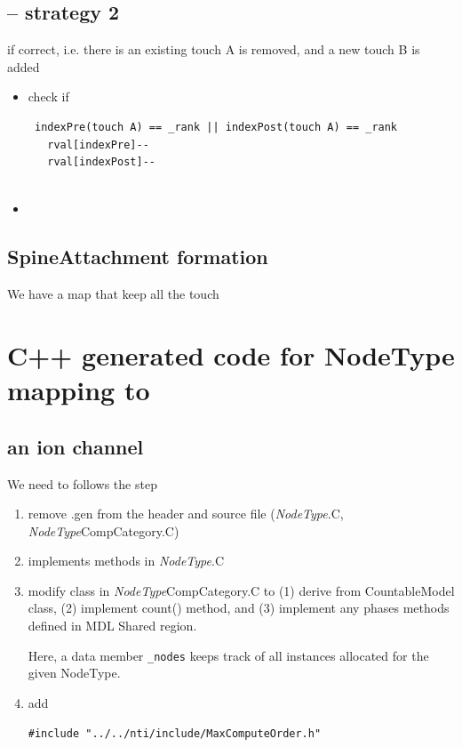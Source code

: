 \subsection{-- strategy 2}

if correct, i.e. there is an existing touch A is removed, and a new touch B is
added
\begin{itemize}
  \item check if 
 \begin{verbatim}
 indexPre(touch A) == _rank || indexPost(touch A) == _rank
   rval[indexPre]--
   rval[indexPost]--
      
 \end{verbatim}
 
  \item 
\end{itemize}

\subsection{SpineAttachment formation}

We have a map that keep all the touch 

\section{C++ generated code for NodeType mapping to }

\subsection{an ion channel}

We need to follows the step
\begin{enumerate}
  \item remove .gen from the header and source file ({\it NodeType}.C,
  {\it NodeType}CompCategory.C)
  
  \item implements methods in {\it NodeType}.C
  
  \item modify class in {\it NodeType}CompCategory.C to (1) derive from
  CountableModel class, (2) implement count() method, and (3) implement any
  phases methods defined in MDL Shared region.
  
Here, a data member \verb!_nodes! keeps track of all instances allocated for the
given NodeType.

  \item add
\begin{verbatim}
#include "../../nti/include/MaxComputeOrder.h"
\end{verbatim}
  
\end{enumerate}

